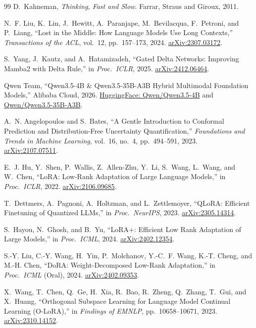 \documentclass[10pt,a4paper]{article}
\begin{document}
\begin{thebibliography}{99}
D.~Kahneman, \textit{Thinking, Fast and Slow}. Farrar, Straus and Giroux, 2011.

N.~F. Liu, K.~Lin, J.~Hewitt, A.~Paranjape, M.~Bevilacqua, F.~Petroni, and P.~Liang, ``Lost in the Middle: How Language Models Use Long Contexts,'' \textit{Transactions of the ACL}, vol.~12, pp.~157--173, 2024. \href{https://arxiv.org/abs/2307.03172}{arXiv:2307.03172}.

S.~Yang, J.~Kautz, and A.~Hatamizadeh, ``Gated Delta Networks: Improving Mamba2 with Delta Rule,'' in \textit{Proc.\ ICLR}, 2025. \href{https://arxiv.org/abs/2412.06464}{arXiv:2412.06464}.

Qwen Team, ``Qwen3.5-4B \& Qwen3.5-35B-A3B Hybrid Multimodal Foundation Models,'' Alibaba Cloud, 2026. \href{https://huggingface.co/Qwen/Qwen3.5-4B}{HuggingFace: Qwen/Qwen3.5-4B} and \href{https://huggingface.co/Qwen/Qwen3.5-35B-A3B}{Qwen/Qwen3.5-35B-A3B}.

A.~N. Angelopoulos and S.~Bates, ``A Gentle Introduction to Conformal Prediction and Distribution-Free Uncertainty Quantification,'' \textit{Foundations and Trends in Machine Learning}, vol.~16, no.~4, pp.~494--591, 2023. \href{https://arxiv.org/abs/2107.07511}{arXiv:2107.07511}.

E.~J. Hu, Y.~Shen, P.~Wallis, Z.~Allen-Zhu, Y.~Li, S.~Wang, L.~Wang, and W.~Chen, ``LoRA: Low-Rank Adaptation of Large Language Models,'' in \textit{Proc.\ ICLR}, 2022. \href{https://arxiv.org/abs/2106.09685}{arXiv:2106.09685}.

T.~Dettmers, A.~Pagnoni, A.~Holtzman, and L.~Zettlemoyer, ``QLoRA: Efficient Finetuning of Quantized LLMs,'' in \textit{Proc.\ NeurIPS}, 2023. \href{https://arxiv.org/abs/2305.14314}{arXiv:2305.14314}.

S.~Hayou, N.~Ghosh, and B.~Yu, ``LoRA+: Efficient Low Rank Adaptation of Large Models,'' in \textit{Proc.\ ICML}, 2024. \href{https://arxiv.org/abs/2402.12354}{arXiv:2402.12354}.

S.-Y. Liu, C.-Y. Wang, H.~Yin, P.~Molchanov, Y.-C.~F. Wang, K.-T. Cheng, and M.-H. Chen, ``DoRA: Weight-Decomposed Low-Rank Adaptation,'' in \textit{Proc.\ ICML} (Oral), 2024. \href{https://arxiv.org/abs/2402.09353}{arXiv:2402.09353}.

X.~Wang, T.~Chen, Q.~Ge, H.~Xia, R.~Bao, R.~Zheng, Q.~Zhang, T.~Gui, and X.~Huang, ``Orthogonal Subspace Learning for Language Model Continual Learning (O-LoRA),'' in \textit{Findings of EMNLP}, pp.~10658--10671, 2023. \href{https://arxiv.org/abs/2310.14152}{arXiv:2310.14152}.


\end{thebibliography}
\end{document}
